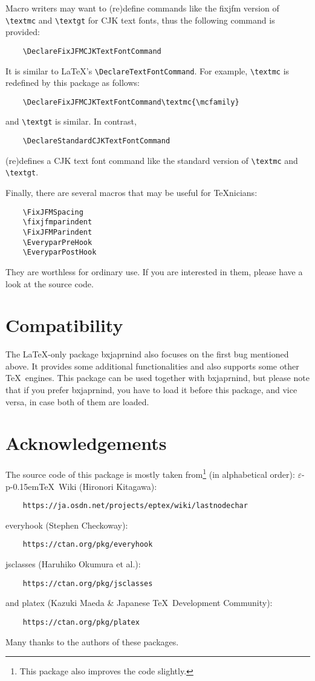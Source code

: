\documentclass[a4paper]{article}
\newcommand\NormalSans{\normalfont\sffamily}
\newcommand\pkg[1]{{\protect\NormalSans#1}}
\newcommand\pTeX{p\kern-0.15em\TeX}
\newcommand\e{\ensuremath{\varepsilon}}
\newcommand\epTeX{\e-\pTeX}
\begin{document}
Macro writers may want to (re)define commands like the \pkg{fixjfm} version of
\verb|\textmc| and \verb|\textgt| for CJK text fonts, thus the following command
is provided:
\begin{verbatim}
    \DeclareFixJFMCJKTextFontCommand
\end{verbatim}
It is similar to \LaTeX's \verb|\DeclareTextFontCommand|. For example,
\verb|\textmc| is redefined by this package as follows:
\begin{verbatim}
    \DeclareFixJFMCJKTextFontCommand\textmc{\mcfamily}
\end{verbatim}
and \verb|\textgt| is similar. In contrast,
\begin{verbatim}
    \DeclareStandardCJKTextFontCommand
\end{verbatim}
(re)defines a CJK text font command like the standard version of \verb|\textmc|
and \verb|\textgt|.

Finally, there are several macros that may be useful for \TeX nicians:
\begin{verbatim}
    \FixJFMSpacing
    \fixjfmparindent
    \FixJFMParindent
    \EveryparPreHook
    \EveryparPostHook
\end{verbatim}
They are worthless for ordinary use. If you are interested in them, please have
a look at the source code.

\section{Compatibility}

The \LaTeX-only package \pkg{bxjaprnind} also focuses on the first bug mentioned
above. It provides some additional functionalities and also supports some other
\TeX\ engines. This package can be used together with \pkg{bxjaprnind}, but
please note that if you prefer \pkg{bxjaprnind}, you have to load it before this
package, and vice versa, in case both of them are loaded.

\section{Acknowledgements}

The source code of this package is mostly taken from\footnote{This package also
improves the code slightly.} (in alphabetical order):
\epTeX\ Wiki (Hironori Kitagawa):
\begin{verbatim}
    https://ja.osdn.net/projects/eptex/wiki/lastnodechar
\end{verbatim}
\pkg{everyhook} (Stephen Checkoway):
\begin{verbatim}
    https://ctan.org/pkg/everyhook
\end{verbatim}
\pkg{jsclasses} (Haruhiko Okumura et al.):
\begin{verbatim}
    https://ctan.org/pkg/jsclasses
\end{verbatim}
and \pkg{platex} (Kazuki Maeda \& Japanese \TeX\ Development Community):
\begin{verbatim}
    https://ctan.org/pkg/platex
\end{verbatim}
Many thanks to the authors of these packages.
\end{document}
